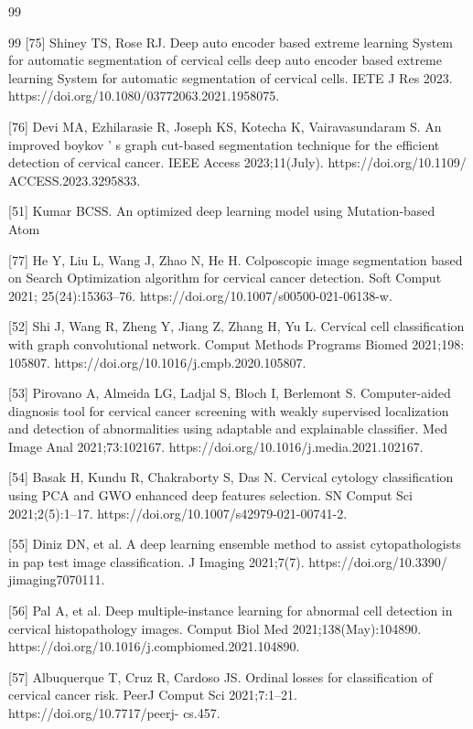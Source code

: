 \documentclass{svjour3}
\begin{document}
\begin{thebibliography}{99}
\begin{thebibliography}{99}
 [75] Shiney TS, Rose RJ. Deep auto encoder based extreme learning System for automatic segmentation of cervical cells deep auto encoder based extreme learning System for automatic segmentation of cervical cells. IETE J Res 2023. https://doi.org/10.1080/03772063.2021.1958075.

 [76] Devi MA, Ezhilarasie R, Joseph KS, Kotecha K, Vairavasundaram S. An improved boykov ’ s graph cut-based segmentation technique for the efficient detection of cervical cancer. IEEE Access 2023;11(July). https://doi.org/10.1109/ ACCESS.2023.3295833.

 [51] Kumar BCSS. An optimized deep learning model using Mutation-based Atom

 [77] He Y, Liu L, Wang J, Zhao N, He H. Colposcopic image segmentation based on Search Optimization algorithm for cervical cancer detection. Soft Comput 2021; 25(24):15363–76. https://doi.org/10.1007/s00500-021-06138-w.

 [52] Shi J, Wang R, Zheng Y, Jiang Z, Zhang H, Yu L. Cervical cell classification with graph convolutional network. Comput Methods Programs Biomed 2021;198: 105807. https://doi.org/10.1016/j.cmpb.2020.105807.

 [53] Pirovano A, Almeida LG, Ladjal S, Bloch I, Berlemont S. Computer-aided diagnosis tool for cervical cancer screening with weakly supervised localization and detection of abnormalities using adaptable and explainable classifier. Med Image Anal 2021;73:102167. https://doi.org/10.1016/j.media.2021.102167.

 [54] Basak H, Kundu R, Chakraborty S, Das N. Cervical cytology classification using PCA and GWO enhanced deep features selection. SN Comput Sci 2021;2(5):1–17. https://doi.org/10.1007/s42979-021-00741-2.

 [55] Diniz DN, et al. A deep learning ensemble method to assist cytopathologists in pap test image classification. J Imaging 2021;7(7). https://doi.org/10.3390/ jimaging7070111.

 [56] Pal A, et al. Deep multiple-instance learning for abnormal cell detection in cervical histopathology images. Comput Biol Med 2021;138(May):104890. https://doi.org/10.1016/j.compbiomed.2021.104890.

 [57] Albuquerque T, Cruz R, Cardoso JS. Ordinal losses for classification of cervical cancer risk. PeerJ Comput Sci 2021;7:1–21. https://doi.org/10.7717/peerj- cs.457.


\end{thebibliography}
\end{thebibliography}
\end{document}

